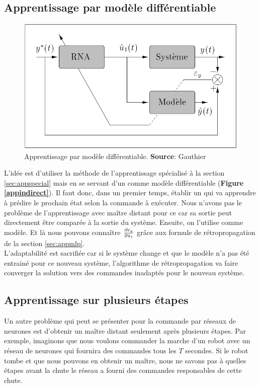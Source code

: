 \subsection{Apprentissage par modèle différentiable}\label{sec:appmodele}
\begin{figure}
 \centering
 \includegraphics[scale=0.5]{../figures/modelediferentiable.jpg}
 \caption{Apprentissage par modèle différentiable. \textbf{Source}: Gauthier\cite{Gauthier}}
 \label{appmodele}
\end{figure}

L'idée est d'utiliser la méthode de l'apprentissage spécialisé à la section \ref{sec:appspecial} mais en se servant d'un \rna comme modèle différentiable (\textbf{Figure \ref{appindirect}}).
Il faut donc, dans un premier temps, établir un \rna qui va apprendre à prédire le prochain état selon la commande à exécuter.
Nous n'avons pas le problème de l'apprentissage avec maître distant pour ce \rna car sa sortie peut directement être comparée à la sortie du système.
Ensuite, on l'utilise comme modèle. Et là nous pouvons connaître $\frac{\partial \varepsilon_y}{\partial \hat{u}_1}$ grâce aux formule de rétropropagation de la section \ref{sec:appmlp}.\\

L'adaptabilité est sacrifiée car si le système change et que le modèle n'a pas été entrainé pour ce nouveau système, l'algorithme de rétropropagation va faire converger la solution vers des commandes inadaptés pour le nouveau système.

\subsection{Apprentissage sur plusieurs étapes}
Un autre problème qui peut se présenter pour la commande par réseaux de neurones est d'obtenir un maître distant seulement après plusieurs étapes.
Par exemple, imaginons que nous voulons commander la marche d'un robot avec un réseau de neurones qui fournira des commandes tous les $T$ secondes.
Si le robot tombe et que nous pouvons en obtenir un maître, nous ne savons pas à quelles étapes avant la chute le réseau a fourni des commandes responsables de cette chute.\\

